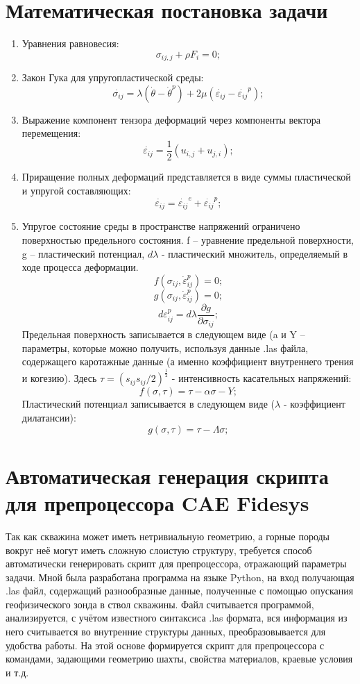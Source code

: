 \documentclass[a4paper,14pt]{scrartcl}
\begin{document}
\newpage
\section{Математическая постановка задачи}
\begin{enumerate}
    \item Уравнения равновесия:
        $$
            \sigma_{ij,j} + \rho F_i = 0;
        $$
    \item Закон Гука для упругопластической среды:
        $$
            \dot{\sigma_{ij}} = \lambda(\dot{\theta} - \dot{\theta}^p) + 2 \mu (\dot{\varepsilon_{ij}} - \dot{\varepsilon_{ij}}^p);
        $$
    \item Выражение компонент тензора деформаций через компоненты вектора перемещения:
        $$
            \dot{\varepsilon_{ij}} = \dfrac{1}{2}(u_{i,j} + u_{j,i});
        $$
    \item Приращение полных деформаций представляется в виде суммы пластической и упругой составляющих:
        $$
            \dot{\varepsilon_{ij}} = \dot{\varepsilon_{ij}}^e + \dot{\varepsilon_{ij}}^p;
        $$
    \item Упругое состояние среды в пространстве напряжений ограничено поверхностью предельного состояния. f – уравнение предельной поверхности, g – пластический потенциал, $d\lambda$ - пластический множитель, определяемый в ходе процесса деформации.
        $$
            f(\sigma_{ij}, \dot{\varepsilon}^p_{ij}) = 0;
        $$
        $$
            g(\sigma_{ij}, \dot{\varepsilon}^p_{ij}) = 0;
        $$
        $$
            d\varepsilon^p_{ij} = d \lambda \dfrac{\partial g}{\partial \sigma_{ij}};
        $$
        Предельная поверхность записывается в следующем виде (a и Y – параметры, которые можно получить, используя данные .las файла, содержащего каротажные данные (а именно коэффициент внутреннего трения и когезию). Здесь $\tau = (s_{ij} s_{ij} / 2)^{\tfrac{1}{2}}$ - интенсивность касательных напряжений:
        $$
            f(\sigma, \tau) = \tau - \alpha \sigma - Y;
        $$
        Пластический потенциал записывается в следующем виде ($\lambda$ - коэффициент дилатансии):
        $$
            g(\sigma, \tau) = \tau - \Lambda \sigma;
        $$
\end{enumerate}


\newpage
\section{Автоматическая генерация скрипта для препроцессора CAE Fidesys}
Так как скважина может иметь нетривиальную геометрию, а горные породы вокруг неё могут иметь сложную слоистую структуру, требуется способ автоматически генерировать скрипт для препроцессора, отражающий параметры задачи. Мной была разработана программа на языке Python, на вход получающая .las файл, содержащий разнообразные данные, полученные с помощью опускания геофизического зонда в ствол скважины. Файл считывается программой, анализируется, с учётом известного синтаксиса .las формата, вся информация из него считывается во внутренние структуры данных, преобразовывается для удобства работы. На этой основе формируется скрипт для препроцессора с командами, задающими геометрию шахты, свойства материалов, краевые условия и т.д.
\end{document}
